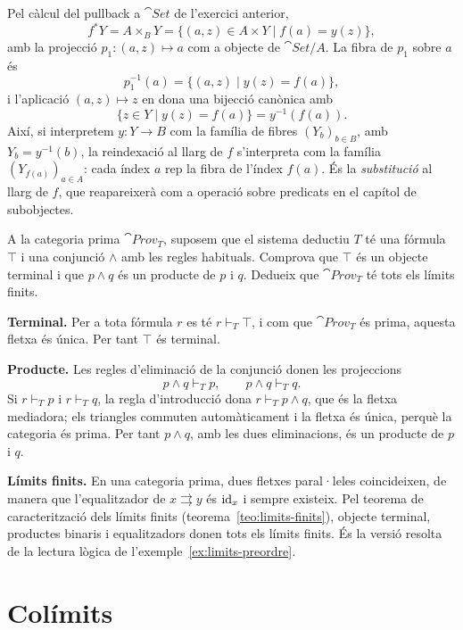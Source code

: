 \begin{solucio}
Pel càlcul del pullback a $\cat{Set}$ de l'exercici anterior,
\[
f^{*}Y=A\times_B Y=\{(a,z)\in A\times Y\mid f(a)=y(z)\},
\]
amb la projecció $p_1\colon(a,z)\mapsto a$ com a objecte de $\cat{Set}/A$. La fibra de $p_1$ sobre $a$ és
\[
p_1^{-1}(a)=\{(a,z)\mid y(z)=f(a)\},
\]
i l'aplicació $(a,z)\mapsto z$ en dona una bijecció canònica amb
\[
\{z\in Y\mid y(z)=f(a)\}=y^{-1}(f(a)).
\]
Així, si interpretem $y\colon Y\to B$ com la família de fibres $(Y_b)_{b\in B}$, amb $Y_b=y^{-1}(b)$, la reindexació al llarg de $f$ s'interpreta com la família $(Y_{f(a)})_{a\in A}$: cada índex $a$ rep la fibra de l'índex $f(a)$. És la \emph{substitució} al llarg de $f$, que reapareixerà com a operació sobre predicats en el capítol de subobjectes.
\end{solucio}

\begin{exercici}\label{pr-provt-limits-finits}
A la categoria prima $\cat{Prov}_T$, suposem que el sistema deductiu $T$ té una fórmula $\top$ i una conjunció $\land$ amb les regles habituals. Comprova que $\top$ és un objecte terminal i que $p\land q$ és un producte de $p$ i $q$. Dedueix que $\cat{Prov}_T$ té tots els límits finits.
\end{exercici}

\begin{solucio}
\textbf{Terminal.} Per a tota fórmula $r$ es té $r\vdash_T\top$, i com que $\cat{Prov}_T$ és prima, aquesta fletxa és única. Per tant $\top$ és terminal.

\textbf{Producte.} Les regles d'eliminació de la conjunció donen les projeccions
\[
p\land q\vdash_T p,
\qquad
p\land q\vdash_T q.
\]
Si $r\vdash_T p$ i $r\vdash_T q$, la regla d'introducció dona $r\vdash_T p\land q$, que és la fletxa mediadora; els triangles commuten automàticament i la fletxa és única, perquè la categoria és prima. Per tant $p\land q$, amb les dues eliminacions, és un producte de $p$ i $q$.

\textbf{Límits finits.} En una categoria prima, dues fletxes paral·leles coincideixen, de manera que l'equalitzador de $x\rightrightarrows y$ és $\operatorname{id}_x$ i sempre existeix. Pel teorema de caracterització dels límits finits (teorema~\ref{teo:limits-finits}), objecte terminal, productes binaris i equalitzadors donen tots els límits finits. És la versió resolta de la lectura lògica de l'exemple~\ref{ex:limits-preordre}.
\end{solucio}

\section{Colímits}


